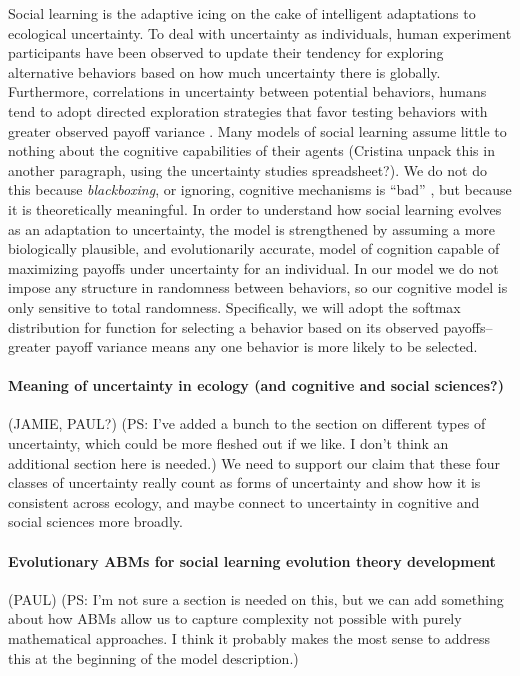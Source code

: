 \documentclass[letterpaper,11.5pt]{scrartcl}
\newcommand{\ps}[1]{{\textcolor{mygreen} {({\tiny PS:} #1)}}}
\begin{document}
Social learning is the adaptive icing on the cake of intelligent adaptations to ecological uncertainty. To deal with uncertainty as individuals, human experiment participants have been observed to update their tendency for exploring alternative behaviors based on how much uncertainty there is globally. Furthermore, correlations in uncertainty between potential behaviors, humans tend to adopt directed exploration strategies that favor testing behaviors with greater observed payoff variance \cite{Wilson2014,Gershman2019}. Many models of social learning assume little to nothing about the cognitive capabilities of their agents (Cristina unpack this in another paragraph, using the uncertainty studies spreadsheet?). We do not do this because \emph{blackboxing}, or ignoring, cognitive mechanisms is “bad” \cite[p. 658]{Heyes2016, Kendal2018}, but because it is theoretically meaningful. In order to understand how social learning evolves as an adaptation to uncertainty, the model is strengthened by assuming a more biologically plausible, and evolutionarily accurate, model of cognition capable of maximizing payoffs under uncertainty for an individual. In our model we do not impose any structure in randomness between behaviors, so our cognitive model is only sensitive to total randomness. Specifically, we will adopt the softmax distribution for function for selecting a behavior based on its observed payoffs–greater payoff variance means any one behavior is more likely to be selected.

\paragraph{Meaning of uncertainty in ecology (and cognitive and social sciences?) } (JAMIE, PAUL?) \ps{I've added a bunch to the section on different types of uncertainty, which could be more fleshed out if we like. I don't think an additional section here is needed.}
We need to support our claim that these four classes of uncertainty really 
count as forms of uncertainty and show how it is consistent across ecology,
and maybe connect to uncertainty in cognitive and social sciences more broadly. 

\paragraph{Evolutionary ABMs for social learning evolution theory development} (PAUL)
\ps{I'm not sure a section is needed on this, but we can add something about how ABMs allow us to capture complexity not possible with purely mathematical approaches. I think it probably makes the most sense to address this at the beginning of the model description.}
\end{document}
